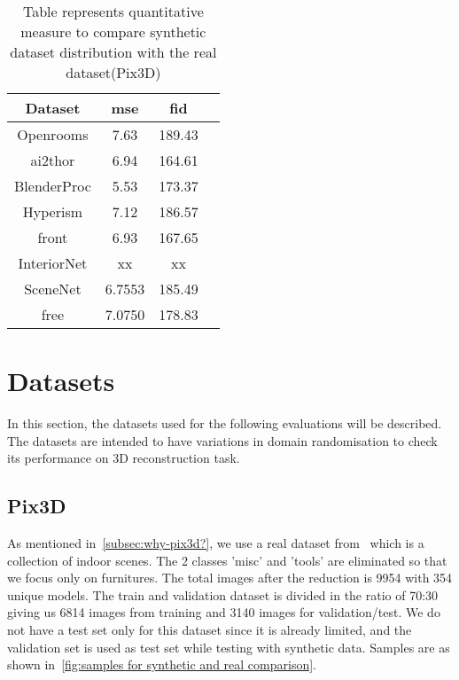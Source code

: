 \begin{table}[ht]
    \centering
    \begin{tabular}{|c |c |c |c|}
        \hline
        Dataset & \gls{mse} & \gls{fid} \\ [0.5ex]
        \hline\hline
        Openrooms & 7.63 & 189.43 \\
        \hline
        \gls{ai2thor} & 6.94 & 164.61 \\
        \hline
        BlenderProc & 5.53 & 173.37 \\
        \hline
        Hyperism & 7.12 & 186.57 \\
        \hline
        \gls{front} & 6.93 & 167.65 \\
        \hline
        InteriorNet & xx & xx \\
        \hline
        SceneNet & 6.7553 & 185.49 \\
        \hline
        \gls{free} & 7.0750 & 178.83 \\[1ex]
        \hline
    \end{tabular}
    \caption{Table represents quantitative measure to compare synthetic dataset distribution with the real dataset(Pix3D)}
    \label{tab:quantitative-dataset-comparison}
\end{table}

\section{Datasets}\label{sec:datasets}
In this section, the datasets used for the following evaluations will be described.
The datasets are intended to have variations in domain randomisation to check its performance on 3D reconstruction task.

\subsection{Pix3D}
As mentioned in~\ref{subsec:why-pix3d?}, we use a real dataset from~\cite{pix3d} which is a collection of indoor scenes.
The 2 classes 'misc' and 'tools' are eliminated so that we focus only on furnitures.
The total images after the reduction is 9954 with 354 unique models.
The train and validation dataset is divided in the ratio of 70:30 giving us 6814 images from training and 3140 images for validation/test.
We do not have a test set only for this dataset since it is already limited, and the validation set is used as test set while testing with synthetic data.
Samples are as shown in~\ref{fig:samples for synthetic and real comparison}.

